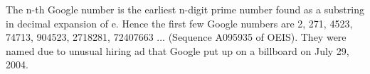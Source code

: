 \documentclass[12pt]{article}
\begin{document}
The n-th Google number is the earliest n-digit prime number found as a substring in decimal expansion of e. Hence the first few Google numbers are 2, 271, 4523, 74713, 904523, 2718281, 72407663 ... (Sequence A095935 of OEIS). They were named due to unusual hiring ad that Google put up on a billboard on July 29, 2004.
\end{document}

